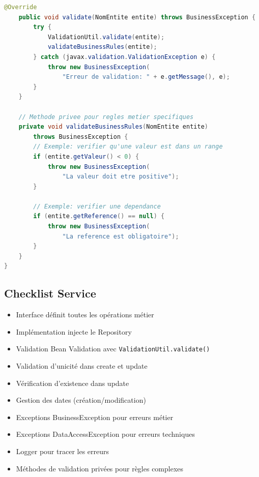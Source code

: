 \documentclass[12pt,a4paper]{article}
\begin{document}
\begin{lstlisting}[language=Java, caption=Template Implementation Service]
    @Override
    public void validate(NomEntite entite) throws BusinessException {
        try {
            ValidationUtil.validate(entite);
            validateBusinessRules(entite);
        } catch (javax.validation.ValidationException e) {
            throw new BusinessException(
                "Erreur de validation: " + e.getMessage(), e);
        }
    }
    
    // Methode privee pour regles metier specifiques
    private void validateBusinessRules(NomEntite entite) 
        throws BusinessException {
        // Exemple: verifier qu'une valeur est dans un range
        if (entite.getValeur() < 0) {
            throw new BusinessException(
                "La valeur doit etre positive");
        }
        
        // Exemple: verifier une dependance
        if (entite.getReference() == null) {
            throw new BusinessException(
                "La reference est obligatoire");
        }
    }
}
\end{lstlisting}

\subsection{Checklist Service}

\begin{itemize}
    \item[$\square$] Interface définit toutes les opérations métier
    \item[$\square$] Implémentation injecte le Repository
    \item[$\square$] Validation Bean Validation avec \texttt{ValidationUtil.validate()}
    \item[$\square$] Validation d'unicité dans create et update
    \item[$\square$] Vérification d'existence dans update
    \item[$\square$] Gestion des dates (création/modification)
    \item[$\square$] Exceptions BusinessException pour erreurs métier
    \item[$\square$] Exceptions DataAccessException pour erreurs techniques
    \item[$\square$] Logger pour tracer les erreurs
    \item[$\square$] Méthodes de validation privées pour règles complexes
\end{itemize}

\newpage
\end{document}

